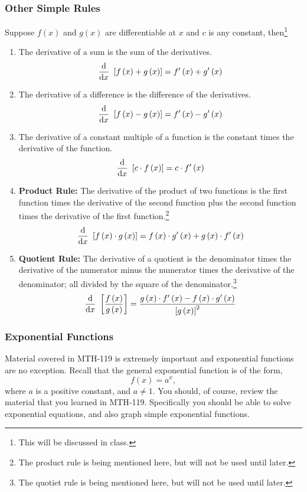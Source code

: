 \documentclass[12pt,addpoints, answers, fleqn]{exam}
\begin{document}
\subsubsection{Other Simple Rules}
Suppose $f\left( x \right)$ and  $g\left( x \right)$ are differentiable at $x$ and $c$ is any constant, then\footnote{This will be discussed in class.}
\begin{enumerate}
\item The derivative of a sum is the sum of the derivatives.
\[
\frac{{\rm{d}}}{{\rm{d}}x} \ \left[ f\left( x \right) +  g\left( x \right) \right]  = f'\left( x \right) +  g'\left( x \right)
\]
\item The derivative of a difference is the difference of the derivatives.
\[
\frac{{\rm{d}}}{{\rm{d}}x} \ \left[ f\left( x \right) -  g\left( x \right) \right]  = f'\left( x \right) -  g'\left( x \right)
\]
\item The derivative of a constant multiple of a function is the constant times the derivative of the function.
\[
\frac{{\rm{d}}}{{\rm{d}}x} \ \left[ c \cdot f\left( x \right) \right]  = c \cdot f'\left( x \right)
\]
\item \textbf{Product Rule:} The derivative of the product of two functions is the first function times the derivative of the second function plus the second function times the derivative of the first function.\footnote{The product rule is being mentioned here, but will not be used until later.}
\[
\frac{{\rm{d}}}{{\rm{d}}x} \ \left[ f\left( x \right) \cdot g\left( x \right) \right]  = f\left( x \right) \cdot g'\left( x \right) + g\left( x \right) \cdot f'\left( x \right)
\]
\item \textbf{Quotient Rule:} The derivative of a quotient is the denominator times the derivative of the numerator minus the numerator times the derivative of the denominator; all divided by the square of the denominator.\footnote{The quotiet rule is being mentioned here, but will not be used until later.}
\[
\frac{{\rm{d}}}{{\rm{d}}x} \ \left[ \frac{f\left( x \right)}{g\left( x \right)} \right]  = \frac{g\left( x \right) \cdot f'\left( x \right) - f\left( x \right) \cdot g'\left( x \right)}{\left[ g\left( x \right)\right]^2} \]
\end{enumerate}
\subsubsection{Exponential Functions}

Material covered in MTH-119 is extremely important and exponential functions are no exception. Recall that the general exponential function is of the form,
\[
f\left( x\right) = a^x,
\]
where $a$ is a positive constant, and $a \neq 1$. You should, of course, review the material that you learned in MTH-119. Specifically you should be able to solve exponential equations, and also graph simple exponential functions.
\end{document}
